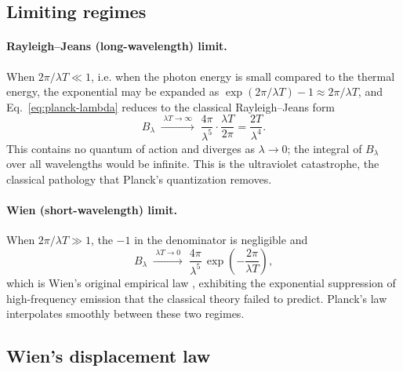\documentclass[10pt]{article}
\theoremstyle{definition}
\theoremstyle{remark}
\begin{document}
\subsection{Limiting regimes}

\paragraph{Rayleigh--Jeans (long-wavelength) limit.} When $2\pi/\lambda T \ll 1$, i.e. when the photon energy is small compared to the thermal energy, the exponential may be expanded as $\exp(2\pi/\lambda T) - 1 \approx 2\pi/\lambda T$, and Eq.~\eqref{eq:planck-lambda} reduces to the classical Rayleigh--Jeans form \cite{rayleigh1900,jeans1905}
\begin{equation}
B_\lambda \;\xrightarrow{\;\lambda T \to \infty\;}\; \frac{4\pi}{\lambda^5}\cdot\frac{\lambda T}{2\pi} = \frac{2T}{\lambda^4}.
\end{equation}
This contains no quantum of action and diverges as $\lambda \to 0$; the integral of $B_\lambda$ over all wavelengths would be infinite. This is the ultraviolet catastrophe, the classical pathology that Planck's quantization removes.

\paragraph{Wien (short-wavelength) limit.} When $2\pi/\lambda T \gg 1$, the $-1$ in the denominator is negligible and
\begin{equation}
B_\lambda \;\xrightarrow{\;\lambda T \to 0\;}\; \frac{4\pi}{\lambda^5}\,\exp\!\left(-\frac{2\pi}{\lambda T}\right),
\end{equation}
which is Wien's original empirical law \cite{wien1896}, exhibiting the exponential suppression of high-frequency emission that the classical theory failed to predict. Planck's law interpolates smoothly between these two regimes.

\subsection{Wien's displacement law}
\end{document}
